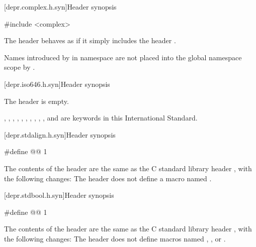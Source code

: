 [depr.complex.h.syn]{Header  synopsis}

%
\begin{codeblock}
#include <complex>
\end{codeblock}

\pnum
The header 
behaves as if it simply includes the header
.

\pnum
\begin{note}
Names introduced by  in namespace 
are not placed into the global namespace scope by .
\end{note}

[depr.iso646.h.syn]{Header  synopsis}

%
\pnum
The \Cpp{} header  is empty.
\begin{note}
,
,
,
,
,
,
,
,
,
, and
are keywords in this International Standard.
\end{note}

[depr.stdalign.h.syn]{Header  synopsis}

%
%
\begin{codeblock}
#define @@ 1
\end{codeblock}

\pnum
The contents of the \Cpp{} header  are the same as the C
standard library header , with the following changes:
The header  does not
define a macro named .


[depr.stdbool.h.syn]{Header  synopsis}

%
%
%
\begin{codeblock}
#define @@ 1
\end{codeblock}

\pnum
The contents of the \Cpp{} header  are the same as the C
standard library header , with the following changes:
The header  does not
define macros named , , or .

